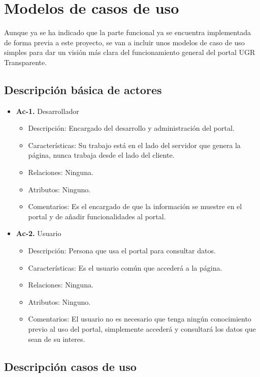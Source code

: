 \section{Modelos de casos de uso}

Aunque ya se ha indicado que la parte funcional ya se encuentra implementada de forma previa a este proyecto, se van a incluir unos modelos de caso de uso simples para dar un visión más clara del funcionamiento general del portal UGR Transparente.

\newpage
\subsection{Descripción básica de actores}

\begin{itemize}
  \item \textbf{Ac-1.} Desarrollador
  \begin{itemize}
   \item Descripción: Encargado del desarrollo y administración del portal.
   \item Características: Su trabajo está en el lado del servidor que genera la página, nunca trabaja desde el lado del cliente.
   \item Relaciones: Ninguna.
   \item Atributos: Ninguno.
   \item Comentarios: Es el encargado de que la información se muestre en el portal y de añadir funcionalidades al portal.
  \end{itemize}
  
  \item \textbf{Ac-2.} Usuario
  \begin{itemize}
   \item Descripción: Persona que usa el portal para consultar datos.
   \item Características: Es el usuario común que accederá a la página.
   \item Relaciones: Ninguna.
   \item Atributos: Ninguno.
   \item Comentarios: El usuario no es necesario que tenga ningún conocimiento previo al uso del portal, simplemente accederá y consultará los datos que sean de su interes.
  \end{itemize}
\end{itemize}

\subsection{Descripción casos de uso}

